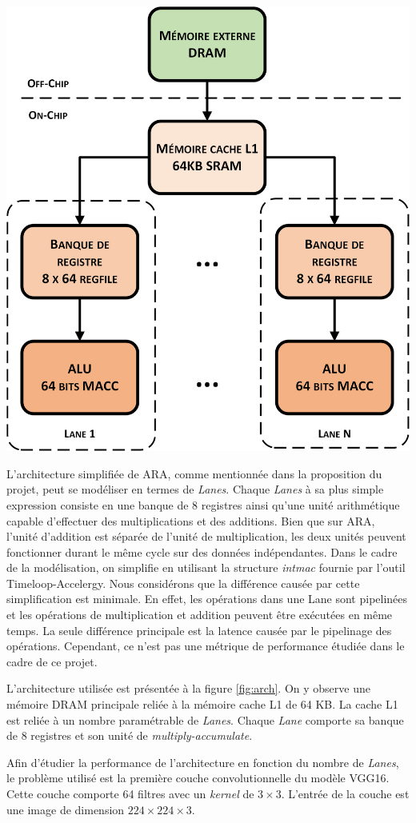 \documentclass[10pt,letterpaper]{article}
\begin{document}
\begin{multicols}{2}
    {\centering
    \includegraphics[width=0.8\linewidth]{arch_visio.png}
    \label{fig:arch}}
    \bigskip

    L'architecture simplifiée de ARA, comme mentionnée dans la proposition du projet, peut se modéliser en termes de 
    \textit{Lanes}. Chaque \textit{Lanes} à sa plus simple expression consiste en une banque de 8 registres ainsi qu'une
    unité arithmétique capable d'effectuer des multiplications et des additions. Bien que sur ARA, l'unité d'addition 
    est séparée de l'unité de multiplication, les deux unités peuvent fonctionner durant le même cycle sur des données
    indépendantes. Dans le cadre de la modélisation, on simplifie en utilisant la structure \textit{intmac} fournie par
    l'outil Timeloop-Accelergy. Nous considérons que la différence causée par cette simplification est minimale. En effet,
    les opérations dans une Lane sont pipelinées et les opérations de multiplication et addition peuvent être exécutées en même temps.
    La seule différence principale est la latence causée par le pipelinage des opérations. Cependant, ce n'est pas une métrique
    de performance étudiée dans le cadre de ce projet.

    L'architecture utilisée est présentée à la figure \ref{fig:arch}. On y observe une mémoire DRAM principale reliée à 
    la mémoire cache L1 de 64 KB. La cache L1 est reliée à un nombre paramétrable de \textit{Lanes}. 
    Chaque \textit{Lane} comporte sa banque de 8 registres et son unité de \textit{multiply-accumulate}.

    Afin d'étudier la performance de l'architecture en fonction du nombre de \textit{Lanes}, le problème utilisé est la première 
    couche convolutionnelle du modèle VGG16. Cette couche comporte 64 filtres avec un \textit{kernel} de $3\times3$. L'entrée de la couche
    est une image de dimension $224\times224\times3$.  

    \end{multicols}
\end{document}
